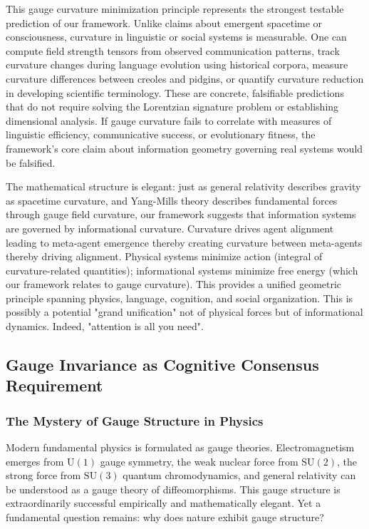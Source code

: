 \documentclass[11pt]{article}
\begin{document}
This gauge curvature minimization principle represents the strongest testable prediction of our framework. Unlike claims about emergent spacetime or consciousness, curvature in linguistic or social systems is measurable. One can compute field strength tensors from observed communication patterns, track curvature changes during language evolution using historical corpora, measure curvature differences between creoles and pidgins, or quantify curvature reduction in developing scientific terminology. These are concrete, falsifiable predictions that do not require solving the Lorentzian signature problem or establishing dimensional analysis. If gauge curvature fails to correlate with measures of linguistic efficiency, communicative success, or evolutionary fitness, the framework's core claim about information geometry governing real systems would be falsified.

The mathematical structure is elegant: just as general relativity describes gravity as spacetime curvature, and Yang-Mills theory describes fundamental forces through gauge field curvature, our framework suggests that information systems are governed by informational curvature. Curvature drives agent alignment leading to meta-agent emergence thereby creating curvature between meta-agents thereby driving alignment. Physical systems minimize action (integral of curvature-related quantities); informational systems minimize free energy (which our framework relates to gauge curvature). This provides a unified geometric principle spanning physics, language, cognition, and social organization. This is possibly a potential "grand unification" not of physical forces but of informational dynamics.  Indeed, "attention is all you need".




\subsection{Gauge Invariance as Cognitive Consensus Requirement}

\subsubsection{The Mystery of Gauge Structure in Physics}

Modern fundamental physics is formulated as gauge theories. Electromagnetism emerges from $\mathrm{U}(1)$ gauge symmetry, the weak nuclear force from $\mathrm{SU}(2)$, the strong force from $\mathrm{SU}(3)$ quantum chromodynamics, and general relativity can be understood as a gauge theory of diffeomorphisms. This gauge structure is extraordinarily successful empirically and mathematically elegant. Yet a fundamental question remains: why does nature exhibit gauge structure?
\end{document}
